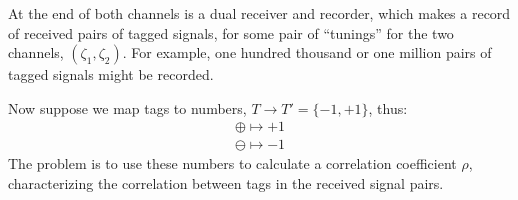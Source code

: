 \documentclass[9pt,technote]{IEEEtran}
\begin{document}
At the end of both channels is a dual receiver and recorder, which
makes a record of received pairs of tagged signals, for some pair of
``tunings'' for the two channels, $(\zeta_1,\zeta_2)$. For example,
one hundred thousand or one million pairs of tagged signals might be
recorded.

Now suppose we map tags to numbers, $T\to T'=\{-1,+1\}$, thus:
\begin{align}
  \oplus \mapsto +1 \\
  \ominus \mapsto -1
\end{align}
The problem is to use these numbers to calculate a correlation
coefficient $\rho$, characterizing the correlation between tags in the
received signal pairs.
\end{document}
